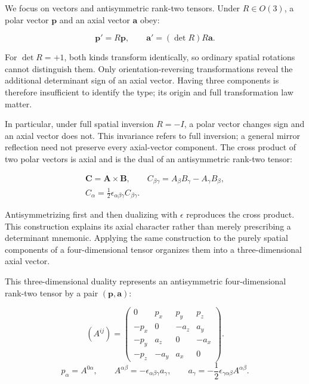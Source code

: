 \documentclass[a4paper,12pt]{article}
\begin{document}
We focus on vectors and antisymmetric rank-two tensors. Under $R\in O(3)$, a polar vector $\boldsymbol p$ and an axial vector $\boldsymbol a$ obey:

\begin{equation}\label{polar-axial}
\boldsymbol p'=R\boldsymbol p,\qquad\boldsymbol a'=(\det R)R\boldsymbol a.
\end{equation}

For $\det R=+1$, both kinds transform identically, so ordinary spatial rotations cannot distinguish them. Only orientation-reversing transformations reveal the additional determinant sign of an axial vector. Having three components is therefore insufficient to identify the type; its origin and full transformation law matter.

In particular, under full spatial inversion $R=-I$, a polar vector changes sign and an axial vector does not. This invariance refers to full inversion; a general mirror reflection need not preserve every axial-vector component. The cross product of two polar vectors is axial and is the dual of an antisymmetric rank-two tensor:

\begin{equation}\label{cross}
\begin{gathered}\boldsymbol C=\boldsymbol A\times\boldsymbol B,\qquad C_{\beta\gamma}=A_\beta B_\gamma-A_\gamma B_\beta,\\C_\alpha=\frac12\epsilon_{\alpha\beta\gamma}C_{\beta\gamma}.\end{gathered}
\end{equation}

Antisymmetrizing first and then dualizing with $\epsilon$ reproduces the cross product. This construction explains its axial character rather than merely prescribing a determinant mnemonic. Applying the same construction to the purely spatial components of a four-dimensional tensor organizes them into a three-dimensional axial vector.

This three-dimensional duality represents an antisymmetric four-dimensional rank-two tensor by a pair $(\boldsymbol p,\boldsymbol a)$:

\begin{equation}\label{antisymmetric-matrix}
(A^{ij})=\begin{pmatrix}0&p_x&p_y&p_z\\-p_x&0&-a_z&a_y\\-p_y&a_z&0&-a_x\\-p_z&-a_y&a_x&0\end{pmatrix}.
\end{equation}
\begin{equation}\label{matrix-components}
p_\alpha=A^{0\alpha},\qquad A^{\alpha\beta}=-\epsilon_{\alpha\beta\gamma}a_\gamma,\qquad a_\gamma=-\frac12\epsilon_{\gamma\alpha\beta}A^{\alpha\beta}.
\end{equation}
\end{document}
